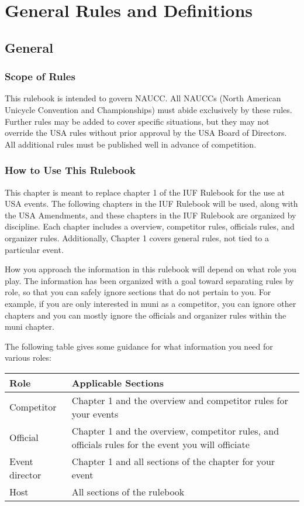 \part{General Rules and Definitions \label{part:general}}
\parttoc
\thispagestyle{empty}

\chapter{General}

\section{Scope of Rules}

This rulebook is intended to govern NAUCC. All NAUCCs (North American Unicycle Convention and Championships) must abide exclusively by these rules.
Further rules may be added to cover specific situations, but they may not override the USA rules without prior approval by the USA Board of Directors.
All additional rules must be published well in advance of competition.

\section{How to Use This Rulebook}%

This chapter is meant to replace chapter 1 of the IUF Rulebook for the use at USA events.
The following chapters in the IUF Rulebook will be used, along with the USA Amendments, and these chapters in the IUF Rulebook are organized by discipline.
Each chapter includes a overview, competitor rules, officials rules, and organizer rules.
Additionally, Chapter 1 covers general rules, not tied to a particular event.

How you approach the information in this rulebook will depend on what role you play.
The information has been organized with a goal toward separating rules by role, so that you can safely ignore sections that do not pertain to you.
For example, if you are only interested in muni as a competitor, you can ignore other chapters and you can mostly ignore the officials and organizer rules within the muni chapter.

The following table gives some guidance for what information you need for various roles:

\begin{longtable}{|l|p{8cm}|}
\hline
\textbf{Role} & \textbf{Applicable Sections} \\
\hline
Competitor & Chapter 1 and the overview and competitor rules for your events\\
\hline
Official & Chapter 1 and the overview, competitor rules, and officials rules for the event you will officiate\\
\hline
Event director & Chapter 1 and all sections of the chapter for your event \\
\hline
Host & All sections of the rulebook\\
\hline
\end{longtable}

